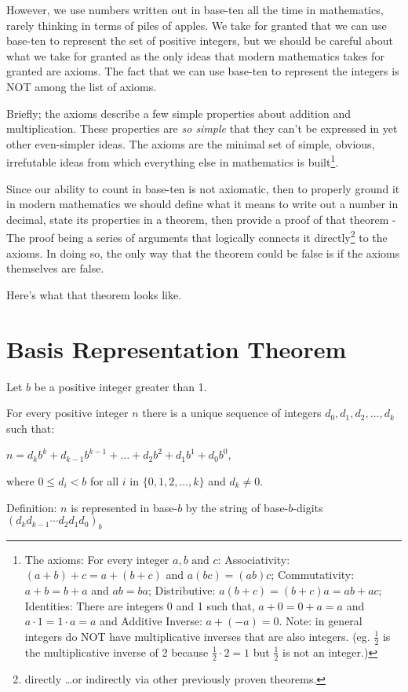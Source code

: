 \documentclass{article}
\newenvironment{jprIn}{\begin{adjustwidth}{2em}{}}{\end{adjustwidth}}
\begin{document}
However, we use numbers written out in base-ten all the time in mathematics,
rarely thinking in terms of piles of apples.
We take for granted
that we can use base-ten to represent the set of positive integers,
but we should be careful about what we take for granted as the 
only ideas that modern mathematics
takes for granted are axioms.
The fact that we can use base-ten to represent the integers is NOT among the list of axioms.

Briefly; the axioms describe a few simple properties about addition and multiplication.
These properties are \emph{so simple} that they can't be expressed in
yet other even-simpler ideas. The axioms are the minimal set of simple,
obvious, irrefutable ideas from which
everything else in mathematics is built\footnote{The axioms:
For every integer $a,b\text{ and }c$:
Associativity: $(a+b)+c=a+(b+c)$ and $a(bc)=(ab)c$;
Commutativity: $a+b=b+a$ and $ab=ba$;
Distributive: $a(b+c)=(b+c)a=ab+ac$;
Identities: There are integers 0 and 1 such that,
$a+0=0+a=a$ and $a\cdot{}1=1\cdot{}a=a$ and
Additive Inverse: $a+(-a)=0$.
Note: in general integers do NOT have multiplicative inverses 
that are also integers. (eg. $\frac{1}{2}$ is the multiplicative
inverse of 2 because $\frac{1}{2}\cdot{}2=1$ but $\frac{1}{2}$ is not an integer.)}.

Since our ability to count in base-ten is not axiomatic, then to properly ground
it in modern mathematics we should
define what it means to write out a number in decimal,
state its properties in a theorem,
then provide a proof of that theorem -
The proof being
a series of arguments that logically connects it
directly\footnote{directly \dots{}or indirectly
via other previously proven theorems.} to the axioms. 
In doing so, the only way
that the theorem could be false is if the axioms themselves are false.

Here's what that theorem looks like.
\section*{Basis Representation Theorem}
\begin{jprIn}
Let $b$ be a positive integer greater than 1.

For every positive integer $n$ there is a unique sequence
of integers $d_0, d_1, d_2,\dots{},d_k$ such that:

\hspace{3em}$n=d_kb^k+d_{k-1}b^{k-1}+\dots+d_2b^2+d_1b^1+d_0b^0$,

where $0\le{}d_i<b$ for all $i$ in $\{0,1,2,\dots{},k\}$ and $d_k\ne0$.

Definition: $n$ is represented in base-$b$ by the string
of base-$b$-digits $(d_kd_{k-1}{\cdots}d_2d_1d_0)_b$
\end{jprIn}
\bigskip
\end{document}
